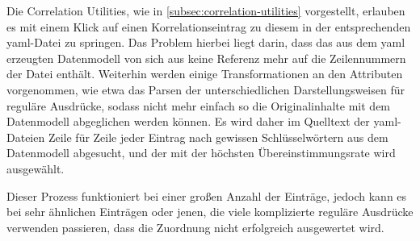 Die Correlation Utilities, wie in \autoref{subsec:correlation-utilities} vorgestellt, erlauben es mit einem Klick auf einen Korrelationseintrag zu diesem in der entsprechenden \acrshort{yaml}-Datei zu springen.
Das Problem hierbei liegt darin, dass das aus dem \acrshort{yaml} erzeugten Datenmodell von sich aus keine Referenz mehr auf die Zeilennummern der Datei enthält.
Weiterhin werden einige Transformationen an den Attributen vorgenommen, wie etwa das Parsen der unterschiedlichen Darstellungsweisen für reguläre Ausdrücke, sodass nicht mehr einfach so die Originalinhalte mit dem Datenmodell abgeglichen werden können.
Es wird daher im Quelltext der \acrshort{yaml}-Dateien Zeile für Zeile jeder Eintrag nach gewissen Schlüsselwörtern aus dem Datenmodell abgesucht, und der mit der höchsten Übereinstimmungsrate wird ausgewählt.

Dieser Prozess funktioniert bei einer großen Anzahl der Einträge, jedoch kann es bei sehr ähnlichen Einträgen oder jenen, die viele komplizierte reguläre Ausdrücke verwenden passieren, dass die Zuordnung nicht erfolgreich ausgewertet wird.
